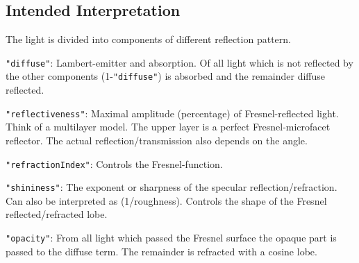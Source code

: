 \documentclass[english,10pt,a4paper,twocolumn,colorscheme=green]{orarticle}
\begin{document}
	\subsection{Intended Interpretation}
	The light is divided into components of different reflection pattern.
	
	\lstinline|"diffuse"|: Lambert-emitter and absorption. Of all light which is not reflected by the other components (1-\lstinline|"diffuse"|) is absorbed and the remainder diffuse reflected.
	
	\lstinline|"reflectiveness"|: Maximal amplitude (percentage) of Fresnel-reflected light. Think of a multilayer model. The upper layer is a perfect Fresnel-microfacet reflector. The actual reflection/transmission also depends on the angle.
	
	\lstinline|"refractionIndex"|: Controls the Fresnel-function.
	
	\lstinline|"shininess"|: The exponent or sharpness of the specular reflection/refraction. Can also be interpreted as (1/roughness). Controls the shape of the Fresnel reflected/refracted lobe.
	
	\lstinline|"opacity"|: From all light which passed the Fresnel surface the opaque part is passed to the diffuse term. The remainder is refracted with a cosine lobe. %
\end{document}
